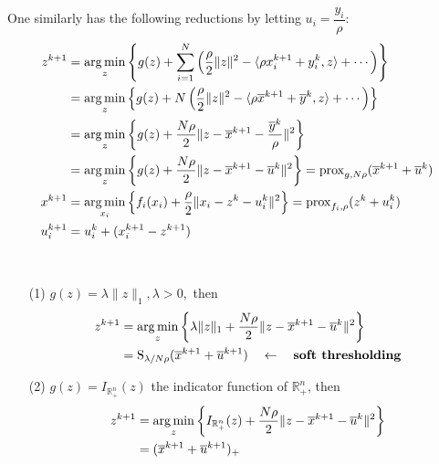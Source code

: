 One similarly has the following reductions by letting $u_i = \dfrac{y_i}{\rho}$:
\begin{align*}
    \tikz[overlay, remember picture]{\node[] (simp_z) {}} z^{k+1} & = \argmin_z \left\{ g(z) + \sum\limits_{i=1}^N \left( \dfrac{\rho}{2}\lVert z \rVert^2 - \langle \rho x_i^{k+1}+y_i^k, z \rangle + \cdots \right) \right\} \\
    & = \argmin_z \left\{ g(z) + N \left( \dfrac{\rho}{2}\lVert z \rVert^2 - \langle \rho \overline{x}^{k+1}+\overline{y}^k, z \rangle + \cdots \right) \right\} \\
    & = \argmin_z \left\{ g(z) + \dfrac{N\rho}{2} \lVert z - \overline{x}^{k+1} - \dfrac{\overline{y}^k}{\rho} \rVert^2 \right\} \\
    & = \argmin_z \left\{ g(z) + \dfrac{N\rho}{2} \lVert z - \overline{x}^{k+1} - \overline{u}^k \rVert^2 \right\} = \operatorname{prox}_{g,N\rho}(\overline{x}^{k+1} + \overline{u}^k) \\
    \tikz[overlay, remember picture]{\node[] (simp_x) {}} x^{k+1} & = \argmin_{x_i} \left\{ f_i(x_i) + \dfrac{\rho}{2} \lVert x_i - z^k - u_i^k \rVert^2 \right\} = \operatorname{prox}_{f_i,\rho}(z^k + u_i^k) \\
    u_i^{k+1} & = u_i^k + (x_i^{k+1} - z^{k+1})
\end{align*}

\begin{eg}\ 
\begin{itemize}
\item[(1)] $g(z) = \lambda \lVert z \rVert_1, \lambda > 0,$ then
\begin{align*}
    z^{k+1} & = \operatorname*{arg\,min}_z \left\{ \lambda \lVert z \rVert_1 + \dfrac{N\rho}{2} \lVert z - \overline{x}^{k+1} - \overline{u}^k \rVert^2 \right\} \\
    & = \operatorname{S}_{\lambda/N\rho} (\overline{x}^{k+1} + \overline{u}^{k+1}) \quad \leftarrow \quad \textbf{soft thresholding}
\end{align*}
\item[(2)] $g(z) = I_{\mathbb{R}^n_+}(z)$ the indicator function of $\mathbb{R}^n_+$, then
\begin{align*}
    z^{k+1} & = \operatorname*{arg\,min}_z \left\{ I_{\mathbb{R}^n_+}(z) + \dfrac{N\rho}{2} \lVert z - \overline{x}^{k+1} - \overline{u}^k \rVert^2 \right\} \\
    & = (\overline{x}^{k+1} + \overline{u}^{k+1})_+
\end{align*}
\end{itemize}
\end{eg}


